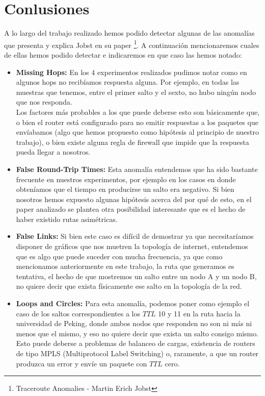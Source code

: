 \section{Conlusiones}


A lo largo del trabajo realizado hemos podido detectar algunas de las anomalías que presenta y explica Jobst en su paper \footnote{Traceroute Anomalies - Martin Erich Jobst}.
A continuación mencionaremos cuales de ellas hemos podido detectar e indicaremos en que caso las hemos notado:

\begin{itemize}
	\item \textbf{Missing Hops:} En los 4 experimentos realizados pudimos notar como en algunos hops no recibíamos respuesta alguna. Por ejemplo, en todas las muestras que tenemos, entre el primer salto y el sexto, no hubo ningún nodo que nos responda. \\
	Los factores más probables a los que puede deberse esto son básicamente que, o bien el router está configurado para no emitir respuestas a los paquetes que envíabamos (algo que hemos propuesto como hipótesis al principio de nuestro trabajo), o bien existe alguna regla de firewall que impide que la respuesta pueda llegar a nosotros.
	
	\item \textbf{False Round-Trip Times:} Esta anomalía entendemos que ha sido bastante frecuente en nuestros experimentos, por ejemplo en los casos en donde obteníamos que el tiempo en producirse un salto era negativo. Si bien nosotros hemos expuesto algunas hipótesis acerca del por qué de esto, en el paper analizado se plantea otra posibilidad interesante que es el hecho de haber existido rutas asimétricas.
	
	\item \textbf{False Links:} Si bien este caso es difícil de demostrar ya que necesitaríamos disponer de gráficos que nos muetren la topología de internet, entendemos que es algo que puede suceder con mucha frecuencia, ya que como mencionamos anteriormente en este trabajo, la ruta que generamos es tentativa, el hecho de que mostremos un salto entre un nodo A y un nodo B, no quiere decir que exista físicamente ese salto en la topología de la red.
	
	\item \textbf{Loops and Circles:}	Para esta anomalía, podemos poner como ejemplo el caso de los saltos correspondientes a los $TTL$ 10 y 11 en la ruta hacia la universidad de Peking, donde ambos nodos que responden no son ni más ni menos que el mismo, y eso no quiere decir que exista un salto consigo mismo. Esto puede deberse a problemas de balanceo de cargas, existencia de routers de tipo MPLS (Multiprotocol Label Switching) o, raramente, a que un router produzca un error y envíe un paquete con $TTL$ cero.
	
\end{itemize}


